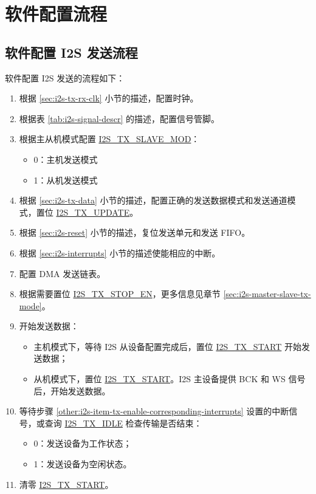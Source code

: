 \documentclass[main\_\_CN.tex]{subfiles}
\begin{document}
\section{软件配置流程}
\subsection{软件配置 I2S 发送流程}\label{sec:i2s-configure-i2s-tx-mode}
软件配置 I2S 发送的流程如下：

\begin{enumerate}
    \item 根据 \ref{sec:i2s-tx-rx-clk} 小节的描述，配置时钟。

    \item 根据表 \ref{tab:i2s-signal-descr} 的描述，配置信号管脚。
    
    \item 根据主从机模式配置 \hyperref[fielddesc:I2STXSLAVEMOD]{I2S\_TX\_SLAVE\_MOD}：
    \begin{itemize}
        \item 0：主机发送模式
        \item 1：从机发送模式
    \end{itemize}
   
    \item 根据 \ref{sec:i2s-tx-data} 小节的描述，配置正确的发送数据模式和发送通道模式，置位 \hyperref[fielddesc:I2STXUPDATE]{I2S\_TX\_UPDATE}。

    \item 根据 \ref{sec:i2s-reset} 小节的描述，复位发送单元和发送 FIFO。
    \item 根据 \ref{sec:i2s-interrupts} 小节的描述使能相应的中断。\label{other:i2s-item-tx-enable-corresponding-interrupts}
    
    \item 配置 DMA 发送链表。 
    
    \item 根据需要置位 \hyperref[fielddesc:I2STXSTOPEN]{I2S\_TX\_STOP\_EN}，更多信息见章节 \ref{sec:i2s-master-slave-tx-mode}。 

    \item 开始发送数据：
    \begin{itemize}
        \item 主机模式下，等待 I2S 从设备配置完成后，置位 \hyperref[fielddesc:I2STXSTART]{I2S\_TX\_START} 开始发送数据；
        \item 从机模式下，置位 \hyperref[fielddesc:I2STXSTART]{I2S\_TX\_START}。I2S 主设备提供 BCK 和 WS 信号后，开始发送数据。
    \end{itemize}

    \item 等待步骤 \ref{other:i2s-item-tx-enable-corresponding-interrupts} 设置的中断信号，或查询 \hyperref[fielddesc:I2STXIDLE]{I2S\_TX\_IDLE} 检查传输是否结束：
    \begin{itemize}
        \item 0：发送设备为工作状态；
        \item 1：发送设备为空闲状态。
    \end{itemize}
    
    \item 清零 \hyperref[fielddesc:I2STXSTART]{I2S\_TX\_START}。
\end{enumerate}
\end{document}
